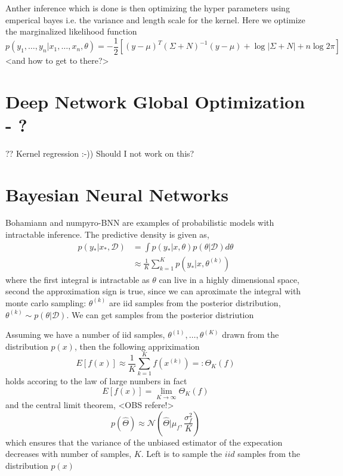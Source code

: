 Anther inference which is done is then optimizing the hyper parameters using emperical bayes i.e.
the variance and length scale for the kernel. Here we optimize the marginalized likelihood function
$$p(y_1, \dots, y_n|x_1, \dots, x_n, \theta) = -\frac{1}{2}[(y-\mu)^T (\Sigma+N)^{-1}(y-\mu)+ \log |\Sigma+N|+n \log 2\pi]$$
<and how to get to there?>


\section{Deep Network Global Optimization - ?} ??
Kernel regression :-))
Should I not work on this?

\section{Bayesian Neural Networks}
Bohamiann and numpyro-BNN are examples of probabilistic models with intractable inference. The predictive density is given as, 
\begin{align*}
    p(y_*|x_*,\mathcal{D}) &= \int p(y_*|x, \theta)p(\theta|\mathcal{D})d\theta\\
    &\approx \frac{1}{K} \sum_{k=1}^K p(y_*|x, \theta^{(k)})
\end{align*}
where the first integral is intractable as $\theta$ can live in a highly dimensional space, second the approximation sign
is true, since we can aproximate the integral with monte carlo sampling: $\theta^{(k)}$ are iid samples from the posterior 
distribution, $\theta^{(k)} \sim p(\theta|\mathcal{D})$. We can get samples from the posterior distriution

\begin{testexample2}
    Assuming we have a number of iid samples, $\theta^{(1)}, \dots, \theta^{(K)}$ drawn from the
    distribution $p(x)$, then the following appriximation 
    $$E[f(x)] \approx \frac{1}{K} \sum_{k=1}^K f(x^{(k)}) =: \Theta_{K}(f)$$
    holds accoring to the law of large numbers 
    in fact $$E[f(x)] = \lim_{K \rightarrow \infty} \Theta_{K}(f)$$
    and the central limit theorem, <OBS refere!>
    $$p(\hat \Theta) \approx \mathcal{N}(\hat \Theta |\mu_f, \frac{\sigma_f^2}{K})$$
    which ensures that the variance of the unbiased estimator of the expecation decreases
    with number of samples, $K$. Left is to sample the $iid$ samples from the distribution $p(x)$
\end{testexample2}

